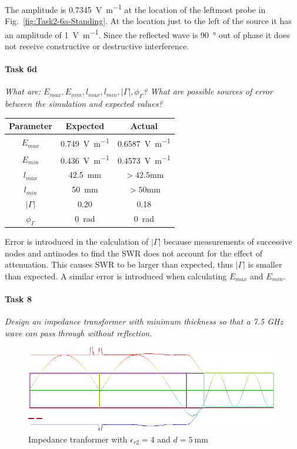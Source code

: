 The amplitude is \SI{0.7345}{\volt\per\meter} at the location of the leftmost probe in Fig.~\ref{fig:Task2-6a-Standing}.
At the location just to the left of the source it has an amplitude of \SI{1}{\volt\per\meter}.
Since the reflected wave is \SI{90}{\degree} out of phase it does not receive constructive or destructive interference.

\paragraph{Task 6d} \textit{What are: $E_{max}, E_{min}, l_{max}, l_{min}, \left|\Gamma\right|, \phi_\Gamma$? What are possible sources of error between the simulation and expected values?}
\begin{table}[htpb]
	\centering
	\begin{tabular}{@{}ccc@{}}
		\toprule
		Parameter             & Expected                   & Actual \\ 
		\midrule
		$E_{max}$             & \SI{0.749}{\volt\per\meter} & \SI{0.6587}{\volt\per\meter} \\
		$E_{min}$             & \SI{0.436}{\volt\per\meter} & \SI{0.4573}{\volt\per\meter} \\
		$l_{max}$             & \SI{42.5}{\milli\meter}    & $>42.5$\si{\milli\meter} \\
		$l_{min}$             & \SI{50}{\milli\meter}      & $>50$\si{\milli\meter} \\
		$\left|\Gamma\right|$ & 0.20 & 0.18 \\
		$\phi_\Gamma$         & 0~\si{\radian} & 0~\si{\radian} \\
		\bottomrule
	\end{tabular}
\end{table}

Error is introduced in the calculation of $\left|\Gamma\right|$ because measurements of successive nodes and antinodes to find the SWR does not account for the effect of attenuation. This causes SWR to be larger than expected, thus $\left|\Gamma\right|$ is smaller than expected.
A similar error is introduced when calculating $E_{max}$ and $E_{min}$.

\pagebreak
\paragraph{Task 8} \textit{Design an impedance transformer with minimum thickness so that a 7.5 GHz wave can pass through without reflection.}

\begin{figure}[tbph]
\centering
\includegraphics[width=0.95\linewidth]{graphics/Task3-8-Standing_5mm}
\caption{Impedance tranformer with $\epsilon_{r2} = 4$ and $d = \SI{5}{\milli\meter}$}
\label{fig:Task3-8-Standing_5mm}
\end{figure}

